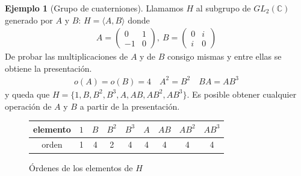 \documentclass{book}
\theoremstyle{definition}
\newtheorem{ej}{Ejemplo}
\theoremstyle{remark}
\begin{document}
\begin{ej}[Grupo de cuaterniones]
	\label{ej:grupocuaterniones}
	Llamamos $H$ al subgrupo de $GL_2(\mathbb{C})$ generado por $A$ y $B$: $H = \langle A, B\rangle$ donde 
	\begin{align*}
	A = \left(\begin{array}{cc}
	0 & 1 \\ -1 & 0
	\end{array}\right),\ B = \left(\begin{array}{cc}
	0 & i \\ i & 0
	\end{array}\right)
	\end{align*}
	De probar las multiplicaciones de $A$ y de $B$ consigo mismas y entre ellas se obtiene la presentación.
	\begin{align*}
	o(A) = o(B) = 4\quad A^2 = B^2 \quad BA = AB^3
	\end{align*}
	y queda que $H = \{1, B, B^2, B^3, A, AB, AB^2, AB^3\}$. Es posible obtener cualquier operación de $A$ y $B$ a partir de la presentación.
	
	\begin{figure}[h]
		\centering
		\begin{tabular}{c|cccccccc}
			elemento & $1$ & $B$ & $B^2$ & $B^3$ & $A$ & $AB$ & $AB^2$ & $AB^3$ \\ \hline
			 orden   &  1  &  4  &   2   &   4   &  4  &  4   &   4    &   4
		\end{tabular}
		\caption{Órdenes de los elementos de $H$}
	\end{figure}
\end{ej}
\end{document}
